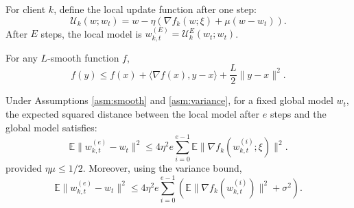 \documentclass{article}
\begin{document}
\begin{definition}
    For client $k$, define the local update function after one step:
    \begin{equation}
        \mathcal{U}_k(w; w_t) = w - \eta \left( \nabla f_k(w; \xi) + \mu (w - w_t) \right).
    \end{equation}
    After $E$ steps, the local model is $w_{k,t}^{(E)} = \mathcal{U}_k^E(w_t; w_t)$.
\end{definition}

\begin{lemma} \label{lem:smooth}
    For any $L$-smooth function $f$,
    \begin{equation}
        f(y) \leq f(x) + \langle \nabla f(x), y-x \rangle + \frac{L}{2} \| y-x \|^2.
    \end{equation}
\end{lemma}

\begin{lemma} \label{lem:drift}
    Under Assumptions \ref{asm:smooth} and \ref{asm:variance}, for a fixed global model $w_t$, the expected squared distance between the local model after $e$ steps and the global model satisfies:
    \begin{equation}
        \mathbb{E} \| w_{k,t}^{(e)} - w_t \|^2 \leq 4 \eta^2 e \sum_{i=0}^{e-1} \mathbb{E} \| \nabla f_k(w_{k,t}^{(i)}; \xi) \|^2.
    \end{equation}
    provided $\eta \mu \leq 1/2$. Moreover, using the variance bound,
    \begin{equation}
        \mathbb{E} \| w_{k,t}^{(e)} - w_t \|^2 \leq 4 \eta^2 e \sum_{i=0}^{e-1} \left( \mathbb{E} \| \nabla f_k(w_{k,t}^{(i)}) \|^2 + \sigma^2 \right).
    \end{equation}
\end{lemma}
\end{document}
